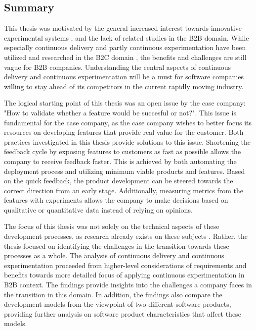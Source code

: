 \documentclass[english, grading]{tktltiki2}
\theoremstyle{definition}
\theoremstyle{remark}
\begin{document}
\subsection{Summary}
This thesis was motivated by the general increased interest towards innovative experimental systems \cite{olsson2012climbing}, and the lack of related studies in the B2B domain. While especially continuous delivery and partly continuous experimentation have been utilized and researched in the B2C domain \cite{neely2013continuous, bosch2012building}, the benefits and challenges are still vague for B2B companies. Understanding the central aspects of continuous delivery and continuous experimentation will be a must for software companies willing to stay ahead of its competitors in the current rapidly moving industry.

The logical starting point of this thesis was an open issue by the case company: "How to validate whether a feature would be succesful or not?". This issue is fundamental for the case company, as  the case company wishes to better focus its resources on developing features that provide real value for the customer. Both practices investigated in this thesis provide solutions to this issue. Shortening the feedback cycle by exposing features to customers as fast as possible allows the company to receive feedback faster. This is achieved by both automating the deployment process and utilizing minimum viable products and features. Based on the quick feedback, the product development can be steered towards the correct direction from an early stage. Additionally, measuring metrics from the features with experiments allows the company to make decisions based on qualitative or quantitative data instead of relying on opinions.
%

The focus of this thesis was not solely on the technical aspects of these development processes, as research already exists on these subjects \cite{kohavi2007practical, eklund2012architecture, cdbook}. Rather, the thesis focused on identifying the challenges in the transition towards these processes as a whole. The analysis of continuous delivery and continuous experimentation proceeded from higher-level considerations of requirements and benefits towards more detailed focus of applying continuous experimentation in B2B context. The findings provide insights into the challenges a company faces in the transition in this domain. In addition, the findings also compare the development models from the viewpoint of two different software products, providing further analysis on software product characteristics that affect these models.
\end{document}
